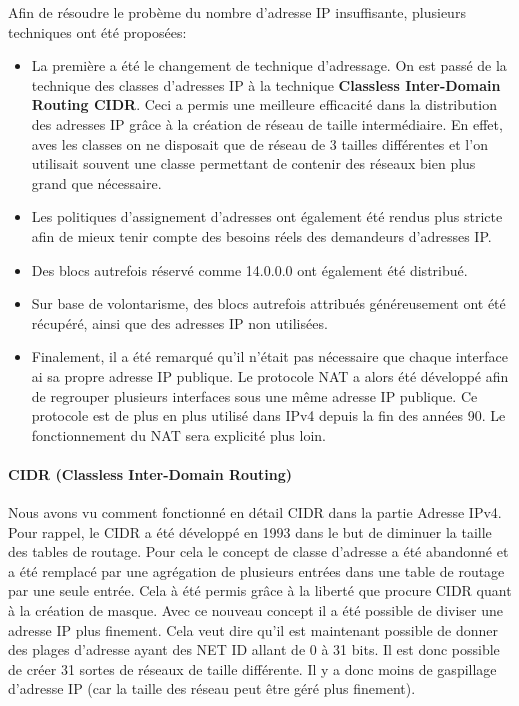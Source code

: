 Afin de résoudre le probème du nombre d'adresse IP insuffisante, plusieurs
techniques ont été proposées:
\begin{itemize}
\item La première a été le changement de technique d'adressage. On est passé de
la technique des classes d'adresses IP à la technique \textbf{Classless
Inter-Domain Routing CIDR}. Ceci a permis une meilleure efficacité dans la
distribution des adresses IP grâce à la création de réseau de taille
intermédiaire. En effet, aves les classes on ne disposait que de réseau de 3
tailles différentes et l'on utilisait souvent une classe permettant de contenir
des réseaux bien plus grand que nécessaire.

\item Les politiques d'assignement d'adresses ont également été rendus plus
stricte afin de mieux tenir compte des besoins réels des demandeurs d'adresses
IP.

\item Des blocs autrefois réservé comme 14.0.0.0 ont également été distribué.

\item Sur base de volontarisme, des blocs autrefois attribués généreusement ont
été récupéré, ainsi que des adresses IP non utilisées.

\item Finalement, il a été remarqué qu'il n'était pas nécessaire que chaque
interface ai sa propre adresse IP publique. Le protocole NAT a alors été
développé afin de regrouper plusieurs interfaces sous une même adresse IP
publique. Ce protocole est de plus en plus utilisé dans IPv4 depuis la fin des
années 90. Le fonctionnement du NAT sera explicité plus loin.
\end{itemize}


\paragraph{CIDR (Classless Inter-Domain Routing)}
Nous avons vu comment fonctionné en détail CIDR dans la partie Adresse IPv4.
Pour rappel, le CIDR a été développé en 1993 dans le but de diminuer la taille
des tables de routage. Pour cela le concept de classe d'adresse a été abandonné
et a été remplacé par une agrégation de plusieurs entrées dans une table de
routage par une seule entrée.  Cela à été permis grâce à la liberté que procure
CIDR quant à la création de masque.  Avec ce nouveau concept il a été possible
de diviser une adresse IP plus finement. Cela veut dire qu'il est maintenant
possible de donner des plages d'adresse ayant des NET ID allant de 0 à 31 bits.
Il est donc possible de créer 31 sortes de réseaux de taille différente. Il y a
donc moins de gaspillage d'adresse IP (car la taille des réseau peut être géré
plus finement).


